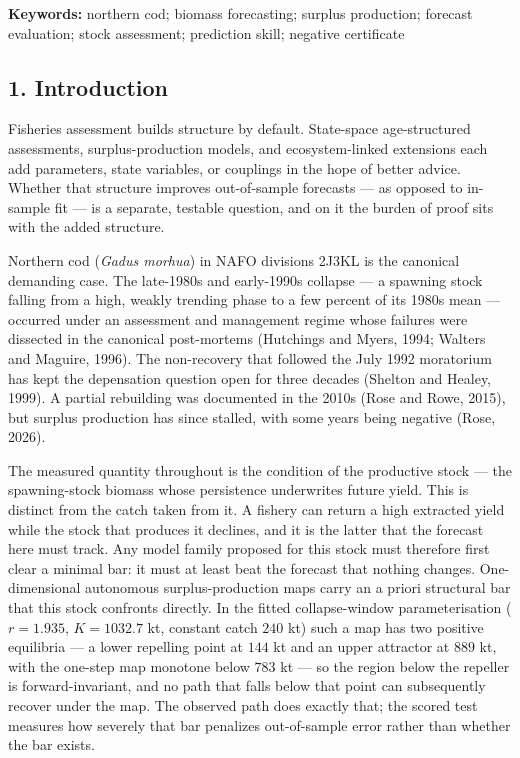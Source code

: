 \documentclass[11pt]{article}
\begin{document}
\textbf{Keywords:} northern cod; biomass forecasting; surplus
production; forecast evaluation; stock assessment; prediction skill;
negative certificate

\subsection{1. Introduction}\label{introduction}

Fisheries assessment builds structure by default. State-space
age-structured assessments, surplus-production models, and
ecosystem-linked extensions each add parameters, state variables, or
couplings in the hope of better advice. Whether that structure improves
out-of-sample forecasts --- as opposed to in-sample fit --- is a
separate, testable question, and on it the burden of proof sits with the
added structure.

Northern cod (\emph{Gadus morhua}) in NAFO divisions 2J3KL is the
canonical demanding case. The late-1980s and early-1990s collapse --- a
spawning stock falling from a high, weakly trending phase to a few
percent of its 1980s mean --- occurred under an assessment and
management regime whose failures were dissected in the canonical
post-mortems (Hutchings and Myers, 1994; Walters and Maguire, 1996). The
non-recovery that followed the July 1992 moratorium has kept the
depensation question open for three decades (Shelton and Healey, 1999).
A partial rebuilding was documented in the 2010s (Rose and Rowe, 2015),
but surplus production has since stalled, with some years being negative
(Rose, 2026).

The measured quantity throughout is the condition of the productive
stock --- the spawning-stock biomass whose persistence underwrites
future yield. This is distinct from the catch taken from it. A fishery
can return a high extracted yield while the stock that produces it
declines, and it is the latter that the forecast here must track. Any
model family proposed for this stock must therefore first clear a
minimal bar: it must at least beat the forecast that nothing changes.
One-dimensional autonomous surplus-production maps carry an a priori
structural bar that this stock confronts directly. In the fitted
collapse-window parameterisation (\(r = 1.935\), \(K = 1032.7\) kt,
constant catch \(240\) kt) such a map has two positive equilibria --- a
lower repelling point at \(144\) kt and an upper attractor at \(889\)
kt, with the one-step map monotone below \(783\) kt --- so the region
below the repeller is forward-invariant, and no path that falls below
that point can subsequently recover under the map. The observed path
does exactly that; the scored test measures how severely that bar
penalizes out-of-sample error rather than whether the bar exists.
\end{document}
